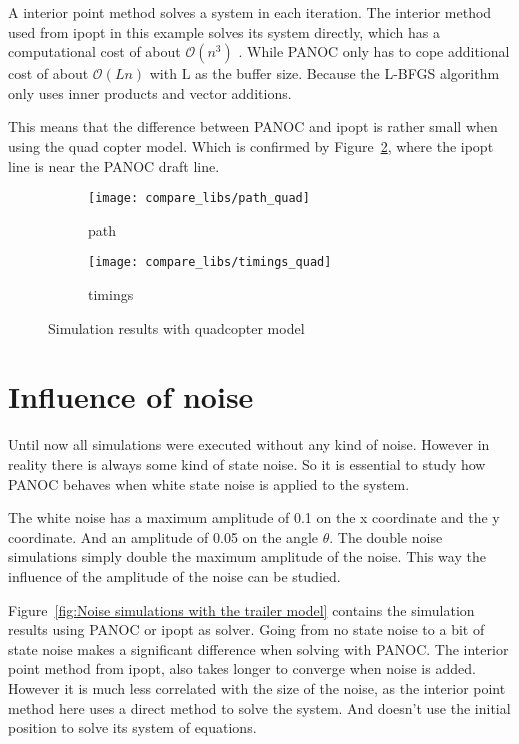 A interior point method solves a system in each iteration. The interior method used from ipopt in this example solves its system directly, which has a computational cost of about $\mathcal{O}(n^3)$ . While PANOC only has to cope additional cost of about $\mathcal{O}(Ln)$ with L as the buffer size.  Because the L-BFGS algorithm only uses inner products and vector additions.

This means that the difference between PANOC and ipopt is rather small when using the quad copter model. Which is confirmed by Figure~\ref{fig:timings trailer quad}, where the ipopt line is near the PANOC draft line.
\begin{figure}[H]
	\centering
	\begin{subfigure}[b]{0.45\textwidth}
		\centering
		\texttt{[image: compare\_libs/path\_quad]}
		\caption{path}
		\label{fig:solution path trailer quad}
	\end{subfigure}
	\hfill
	\begin{subfigure}[b]{0.45\textwidth}
		\centering
		\texttt{[image: compare\_libs/timings\_quad]}
		\caption{timings}
		\label{fig:timings trailer quad}
	\end{subfigure}
	\caption{Simulation results with quadcopter model}
	\label{fig:Simulation results with quadcopter}
\end{figure}

\section{Influence of noise}
Until now all simulations were executed without any kind of noise. However in reality there is always some kind of state noise. So it is essential to study how PANOC behaves when white state noise is applied to the system.

The white noise has a maximum amplitude of 0.1 on the x coordinate and the y coordinate. And an amplitude of 0.05 on the angle $\theta$. The double noise simulations simply double the maximum amplitude of the noise. This way the influence of the amplitude of the noise can be studied.

Figure~\ref{fig:Noise simulations with the trailer model} contains the simulation results using PANOC or ipopt as solver. Going from no state noise to a bit of state noise makes a significant difference when solving with PANOC. The interior point method from ipopt, also takes longer to converge when noise is added. However it is much less correlated with the size of the noise, as the interior point method here uses a direct method to solve the system. And doesn't use the initial position to solve its system of equations. 

